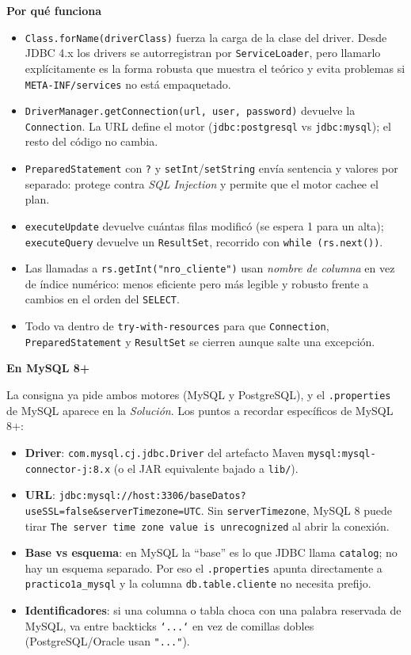 \documentclass[11pt,a4paper]{article}
\newcommand{\itemcabecera}[1]{\noindent\textbf{#1}\par\medskip}
\newcommand{\bloquePorque}{\itemcabecera{Por qu\'e funciona}}
\newcommand{\bloqueMySQL}{\itemcabecera{En MySQL 8+}}
\begin{document}
\bloquePorque

\begin{itemize}
    \item \texttt{Class.forName(driverClass)} fuerza la carga de la clase del driver. Desde JDBC 4.x los drivers se autorregistran por \texttt{ServiceLoader}, pero llamarlo explícitamente es la forma robusta que muestra el teórico y evita problemas si \texttt{META-INF/services} no está empaquetado.
    \item \texttt{DriverManager.getConnection(url, user, password)} devuelve la \texttt{Connection}. La URL define el motor (\texttt{jdbc:postgresql} vs \texttt{jdbc:mysql}); el resto del código no cambia.
    \item \texttt{PreparedStatement} con \texttt{?} y \texttt{setInt}/\texttt{setString} envía sentencia y valores por separado: protege contra \emph{SQL Injection} y permite que el motor cachee el plan.
    \item \texttt{executeUpdate} devuelve cuántas filas modificó (se espera 1 para un alta); \texttt{executeQuery} devuelve un \texttt{ResultSet}, recorrido con \texttt{while (rs.next())}.
    \item Las llamadas a \texttt{rs.getInt("nro\_cliente")} usan \emph{nombre de columna} en vez de índice numérico: menos eficiente pero más legible y robusto frente a cambios en el orden del \texttt{SELECT}.
    \item Todo va dentro de \texttt{try-with-resources} para que \texttt{Connection}, \texttt{PreparedStatement} y \texttt{ResultSet} se cierren aunque salte una excepción.
\end{itemize}

\bloqueMySQL

La consigna ya pide ambos motores (MySQL y PostgreSQL), y el \texttt{.properties} de MySQL aparece en la \textit{Solución}. Los puntos a recordar específicos de MySQL 8+:

\begin{itemize}
    \item \textbf{Driver}: \texttt{com.mysql.cj.jdbc.Driver} del artefacto Maven \texttt{mysql:mysql-connector-j:8.x} (o el JAR equivalente bajado a \texttt{lib/}).
    \item \textbf{URL}: \texttt{jdbc:mysql://host:3306/baseDatos?useSSL=false\&serverTimezone=UTC}. Sin \texttt{serverTimezone}, MySQL 8 puede tirar \texttt{The server time zone value is unrecognized} al abrir la conexión.
    \item \textbf{Base vs esquema}: en MySQL la ``base'' es lo que JDBC llama \texttt{catalog}; no hay un esquema separado. Por eso el \texttt{.properties} apunta directamente a \texttt{practico1a\_mysql} y la columna \texttt{db.table.cliente} no necesita prefijo.
    \item \textbf{Identificadores}: si una columna o tabla choca con una palabra reservada de MySQL, va entre backticks \texttt{`...`} en vez de comillas dobles (PostgreSQL/Oracle usan \texttt{"..."}).
\end{itemize}
\end{document}
